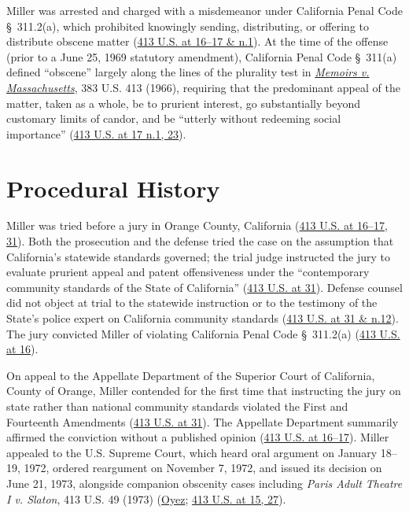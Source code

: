 \documentclass[12pt]{article}
\begin{document}
Miller was arrested and charged with a misdemeanor under California Penal Code \S~311.2(a), which prohibited knowingly sending, distributing, or offering to distribute obscene matter (\href{https://supreme.justia.com/cases/federal/us/413/15/}{413 U.S. at 16--17 \& n.1}). At the time of the offense (prior to a June 25, 1969 statutory amendment), California Penal Code \S~311(a) defined ``obscene'' largely along the lines of the plurality test in \href{https://supreme.justia.com/cases/federal/us/383/413/}{\textit{Memoirs v. Massachusetts}}, 383 U.S. 413 (1966), requiring that the predominant appeal of the matter, taken as a whole, be to prurient interest, go substantially beyond customary limits of candor, and be ``utterly without redeeming social importance'' (\href{https://supreme.justia.com/cases/federal/us/413/15/}{413 U.S. at 17 n.1, 23}).

\section{Procedural History}
Miller was tried before a jury in Orange County, California (\href{https://supreme.justia.com/cases/federal/us/413/15/}{413 U.S. at 16--17, 31}). Both the prosecution and the defense tried the case on the assumption that California's statewide standards governed; the trial judge instructed the jury to evaluate prurient appeal and patent offensiveness under the ``contemporary community standards of the State of California'' (\href{https://supreme.justia.com/cases/federal/us/413/15/}{413 U.S. at 31}). Defense counsel did not object at trial to the statewide instruction or to the testimony of the State's police expert on California community standards (\href{https://supreme.justia.com/cases/federal/us/413/15/}{413 U.S. at 31 \& n.12}). The jury convicted Miller of violating California Penal Code \S~311.2(a) (\href{https://supreme.justia.com/cases/federal/us/413/15/}{413 U.S. at 16}).

On appeal to the Appellate Department of the Superior Court of California, County of Orange, Miller contended for the first time that instructing the jury on state rather than national community standards violated the First and Fourteenth Amendments (\href{https://supreme.justia.com/cases/federal/us/413/15/}{413 U.S. at 31}). The Appellate Department summarily affirmed the conviction without a published opinion (\href{https://supreme.justia.com/cases/federal/us/413/15/}{413 U.S. at 16--17}). Miller appealed to the U.S. Supreme Court, which heard oral argument on January 18--19, 1972, ordered reargument on November 7, 1972, and issued its decision on June 21, 1973, alongside companion obscenity cases including \textit{Paris Adult Theatre I v. Slaton}, 413 U.S. 49 (1973) (\href{https://www.oyez.org/cases/1971/70-73}{Oyez}; \href{https://supreme.justia.com/cases/federal/us/413/15/}{413 U.S. at 15, 27}).
\end{document}
